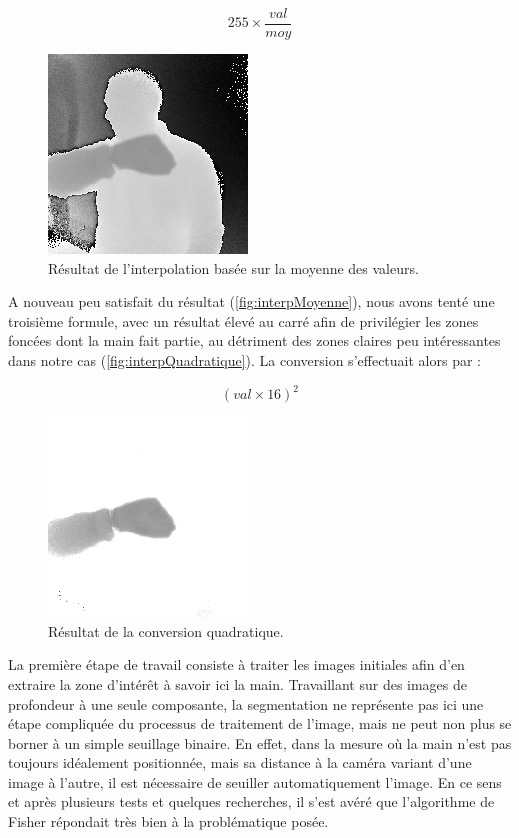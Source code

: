 \[
255\times\frac{val}{moy}
\]

\begin{figure}[htb!]
\centerline{\includegraphics{interpMoyenne.png}}
\caption{Résultat de l'interpolation basée sur la moyenne des valeurs.}
\label{fig:interpMoyenne}
\end{figure}

A nouveau peu satisfait du résultat (\autoref{fig:interpMoyenne}), nous avons tenté une troisième formule, avec un résultat élevé au carré afin de privilégier les zones foncées dont la main fait partie, au détriment des zones claires peu intéressantes dans notre cas (\autoref{fig:interpQuadratique}). La conversion s'effectuait alors par :

\[
(val \times 16)^2
\]

\begin{figure}[htb!]
\centerline{\includegraphics{interpQuadratique.png}}
\caption{Résultat de la conversion quadratique.}
\label{fig:interpQuadratique}
\end{figure}

La première étape de travail consiste à traiter les images initiales afin d’en extraire la zone d’intérêt à savoir ici la main. Travaillant sur des images de profondeur à une seule composante, la segmentation ne représente pas ici une étape compliquée du processus de traitement de l’image, mais ne peut non plus se borner à un simple seuillage binaire. En effet, dans la mesure où la main n’est pas toujours idéalement positionnée, mais sa distance à la caméra variant d’une image à l’autre, il est nécessaire de seuiller automatiquement l’image. En ce sens et après plusieurs tests et quelques recherches, il s’est avéré que l’algorithme de Fisher répondait très bien à la problématique posée.

